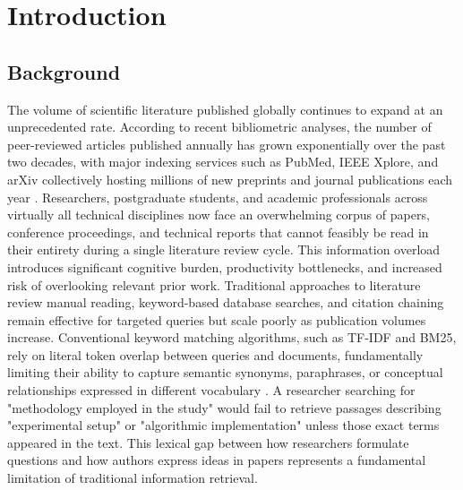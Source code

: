 \chapter{Introduction}

\section{Background}


The volume of scientific literature published globally continues to expand at an unprecedented rate. According to recent bibliometric analyses, the number of peer-reviewed articles published annually has grown exponentially over the past two decades, with major indexing services such as PubMed, IEEE Xplore, and arXiv collectively hosting millions of new preprints and journal publications each year \citep{bornmann2015growth}. Researchers, postgraduate students, and academic professionals across virtually all technical disciplines now face an overwhelming corpus of papers, conference proceedings, and technical reports that cannot feasibly be read in their entirety during a single literature review cycle. This information overload introduces significant cognitive burden, productivity bottlenecks, and increased risk of overlooking relevant prior work.
\newline \newline Traditional approaches to literature review manual reading, keyword-based database searches, and citation chaining remain effective for targeted queries but scale poorly as publication volumes increase. Conventional keyword matching algorithms, such as TF-IDF and BM25, rely on literal token overlap between queries and documents, fundamentally limiting their ability to capture semantic synonyms, paraphrases, or conceptual relationships expressed in different vocabulary \citep{robertson2009probabilistic}. A researcher searching for "methodology employed in the study" would fail to retrieve passages describing "experimental setup" or "algorithmic implementation" unless those exact terms appeared in the text. This lexical gap between how researchers formulate questions and how authors express ideas in papers represents a fundamental limitation of traditional information retrieval.
